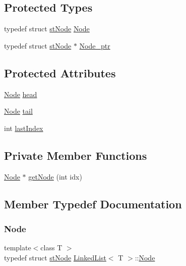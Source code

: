 \subsection*{Protected Types}
\begin{DoxyCompactItemize}
\item 
typedef struct \hyperlink{struct_linked_list_1_1st_node}{st\+Node} \hyperlink{class_linked_list_a58a054a6f1b73397efedc0428d2e7804}{Node}
\item 
typedef struct \hyperlink{struct_linked_list_1_1st_node}{st\+Node} $\ast$ \hyperlink{class_linked_list_ab8ae2052461bb438c55fe2786d281850}{Node\+\_\+ptr}
\end{DoxyCompactItemize}
\subsection*{Protected Attributes}
\begin{DoxyCompactItemize}
\item 
\hyperlink{class_linked_list_a58a054a6f1b73397efedc0428d2e7804}{Node} \hyperlink{class_linked_list_ab988fa5b90980a11bbe3ccb260c1de40}{head}
\item 
\hyperlink{class_linked_list_a58a054a6f1b73397efedc0428d2e7804}{Node} \hyperlink{class_linked_list_a130cacd1659d0ccda25b90620a46599f}{tail}
\item 
int \hyperlink{class_linked_list_ac4d966cb83192e9d8d11084e3436939c}{last\+Index}
\end{DoxyCompactItemize}
\subsection*{Private Member Functions}
\begin{DoxyCompactItemize}
\item 
\hyperlink{class_linked_list_a58a054a6f1b73397efedc0428d2e7804}{Node} $\ast$ \hyperlink{class_linked_list_ab3581a8bd5bca4ba6c743473190ae4e6}{get\+Node} (int idx)
\end{DoxyCompactItemize}


\subsection{Member Typedef Documentation}
\mbox{\label{class_linked_list_a58a054a6f1b73397efedc0428d2e7804}} 
\subsubsection{\texorpdfstring{Node}{Node}}
{\footnotesize\ttfamily template$<$class T $>$ \\
typedef struct \hyperlink{struct_linked_list_1_1st_node}{st\+Node} \hyperlink{class_linked_list}{Linked\+List}$<$ T $>$\+::\hyperlink{class_linked_list_a58a054a6f1b73397efedc0428d2e7804}{Node}\hspace{0.3cm}{\ttfamily [protected]}}

